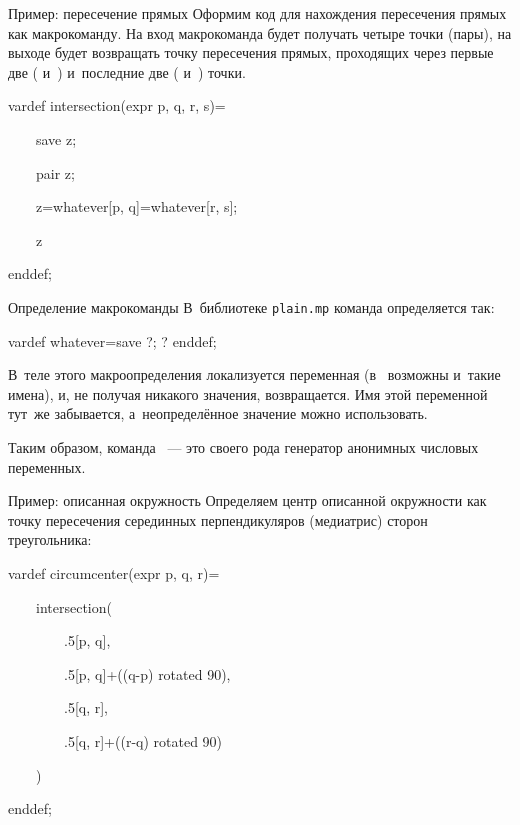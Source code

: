 \begin{frame}{Пример: пересечение прямых}
Оформим код для нахождения пересечения прямых как макрокоманду. На вход
макрокоманда будет получать четыре точки (пары), на выходе будет возвращать
точку пересечения прямых, проходящих через первые две (
и~) и~последние две ( и~) точки.
\begin{programlisting}
vardef intersection(expr p, q, r, s)=\par
~~~~save z;\par
~~~~pair z;\par
~~~~z=whatever[p, q]=whatever[r, s];\par
~~~~z\par
enddef;
\end{programlisting}
\end{frame}

\begin{frame}{Определение макрокоманды }
В~библиотеке \nolinkurl{plain.mp} команда  определяется так:
\begin{programlisting}
vardef whatever=save ?; ? enddef;
\end{programlisting}
В~теле этого макроопределения локализуется переменная 
(в~ возможны и~такие имена), и, не получая никакого значения,
возвращается. Имя этой переменной тут~же забывается, а~неопределённое значение
можно использовать.

Таким образом, команда ~— это своего рода генератор анонимных
числовых переменных.
\end{frame}

\begin{frame}{Пример: описанная окружность}
Определяем центр описанной окружности как точку пересечения серединных
перпендикуляров (медиатрис) сторон треугольника:
\begin{programlisting}
vardef circumcenter(expr p, q, r)=\par
~~~~intersection(\par
~~~~~~~~.5[p, q],\par
~~~~~~~~.5[p, q]+((q-p) rotated 90),\par
~~~~~~~~.5[q, r],\par
~~~~~~~~.5[q, r]+((r-q) rotated 90)\par
~~~~)\par
enddef;
\end{programlisting}
\end{frame}

